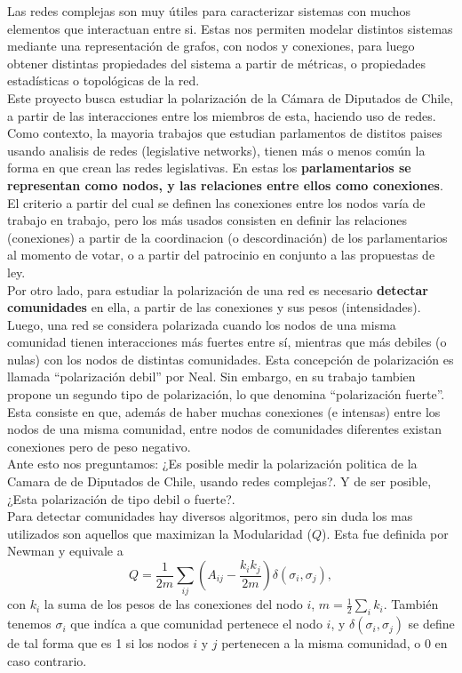 \documentclass{proyectotesis}
\begin{document}
Las redes complejas son muy útiles para caracterizar sistemas con muchos elementos que interactuan entre si. Estas nos permiten modelar distintos sistemas mediante una representación de grafos, con nodos y conexiones, para luego obtener distintas propiedades del sistema a partir de métricas, o propiedades estadísticas o topológicas de la red.\\

Este proyecto busca estudiar la polarización de la Cámara de Diputados de Chile, a partir de las interacciones entre los miembros de esta, haciendo uso de redes. 
Como contexto, la mayoria trabajos que estudian parlamentos de distitos paises usando analisis de redes (legislative networks), tienen más o menos común la forma en que crean las redes legislativas. En estas los \textbf{parlamentarios se representan como nodos, y las relaciones entre ellos como conexiones}. El criterio a partir del cual se definen las conexiones entre los nodos varía de trabajo en trabajo, pero los más usados consisten en definir las relaciones (conexiones) a partir de la coordinacion (o descordinación) de los parlamentarios al momento de votar, o a partir del patrocinio en conjunto a las propuestas de ley.\\

Por otro lado, para estudiar la polarización de una red es necesario \textbf{detectar comunidades} en ella, a partir de las conexiones y sus pesos (intensidades). Luego, una red se considera polarizada cuando los nodos de una misma comunidad tienen interacciones más fuertes entre sí, mientras que más debiles (o nulas) con los nodos de distintas comunidades. Esta concepción de polarización es llamada ``polarización debil'' por Neal. Sin embargo, en su trabajo tambien propone un segundo tipo de polarización, lo que denomina ``polarización fuerte''. Esta consiste en que, además de haber muchas conexiones (e intensas) entre los nodos de una misma comunidad, entre nodos de comunidades diferentes existan conexiones pero de peso negativo.\\

Ante esto nos preguntamos: ¿Es posible medir la polarización politica de la Camara de de Diputados de Chile, usando redes complejas?. Y de ser posible, ¿Esta polarización de tipo debil o fuerte?.\\

Para detectar comunidades hay diversos algoritmos, pero sin duda los mas utilizados son aquellos que maximizan la Modularidad ($Q$). Esta fue definida por Newman y equivale a 
\begin{equation}
    Q = \frac{1}{2m}\sum_{ij} \left( A_{ij} - \frac{k_i k_j}{2m}  \right) \delta(\sigma_i,\sigma_j) \label{mod}
,\end{equation}
con $k_i$ la suma de los pesos de las conexiones del nodo $i$, $m = \frac{1}{2} \sum_i k_i$. También tenemos $\sigma_i$ que indíca a que comunidad pertenece el nodo $i$, y $\delta(\sigma_i,\sigma_j)$ se define de tal forma que es 1 si los nodos $i$ y $j$ pertenecen a la misma comunidad, o 0 en caso contrario.
\end{document}
